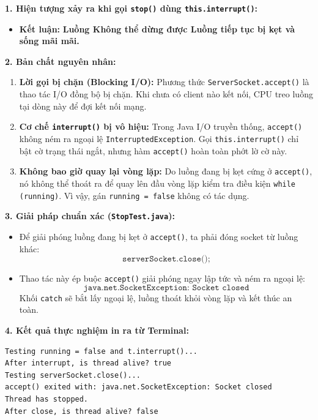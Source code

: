 \documentclass[11pt,a4paper]{article}
\begin{document}
\begin{solutionbox}[title=Phân tích \& Giải thích: Cơ chế Dừng luồng khi bị tắc nghẽn ở accept()]
\textbf{1. Hiện tượng xảy ra khi gọi \texttt{stop()} dùng \texttt{this.interrupt()}:}
\begin{itemize}
    \item \textbf{Kết luận:} \textbf{Luồng Không thể dừng được Luồng tiếp tục bị kẹt và sống mãi mãi.}
\end{itemize}

\textbf{2. Bản chất nguyên nhân:}
\begin{enumerate}
    \item \textbf{Lời gọi bị chặn (Blocking I/O):} Phương thức \texttt{ServerSocket.accept()} là thao tác I/O đồng bộ bị chặn. Khi chưa có client nào kết nối, CPU treo luồng tại dòng này để đợi kết nối mạng.
    \item \textbf{Cơ chế \texttt{interrupt()} bị vô hiệu:} Trong Java I/O truyền thống, \texttt{accept()} không ném ra ngoại lệ \texttt{InterruptedException}. Gọi \texttt{this.interrupt()} chỉ bật cờ trạng thái ngắt, nhưng hàm \texttt{accept()} hoàn toàn phớt lờ cờ này.
    \item \textbf{Không bao giờ quay lại vòng lặp:} Do luồng đang bị kẹt cứng ở \texttt{accept()}, nó không thể thoát ra để quay lên đầu vòng lặp kiểm tra điều kiện \texttt{while (running)}. Vì vậy, gán \texttt{running = false} không có tác dụng.
\end{enumerate}

\textbf{3. Giải pháp chuẩn xác (\texttt{StopTest.java}):}
\begin{itemize}
    \item Để giải phóng luồng đang bị kẹt ở \texttt{accept()}, ta phải đóng socket từ luồng khác:
    $$\texttt{serverSocket.close();}$$
    \item Thao tác này ép buộc \texttt{accept()} giải phóng ngay lập tức và ném ra ngoại lệ:
    $$\texttt{java.net.SocketException: Socket closed}$$
    Khối \texttt{catch} sẽ bắt lấy ngoại lệ, luồng thoát khỏi vòng lặp và kết thúc an toàn.
\end{itemize}

\textbf{4. Kết quả thực nghiệm in ra từ Terminal:}
\begin{verbatim}
Testing running = false and t.interrupt()...
After interrupt, is thread alive? true
Testing serverSocket.close()...
accept() exited with: java.net.SocketException: Socket closed
Thread has stopped.
After close, is thread alive? false
\end{verbatim}
\end{solutionbox}
\end{document}
